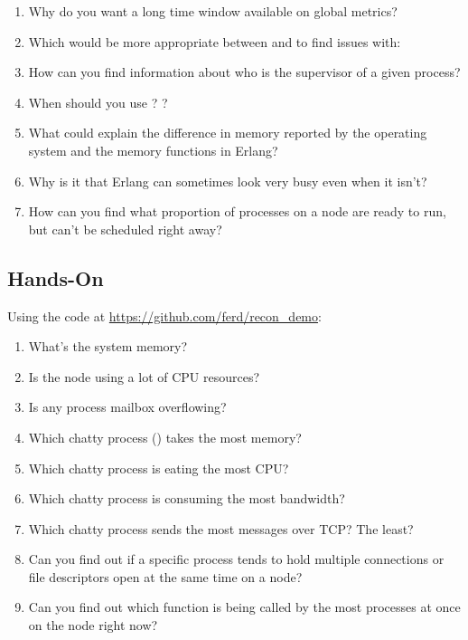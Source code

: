 \documentclass[11pt, oneside]{book}   	%
\begin{document}
\begin{enumerate}
	\item Why do you want a long time window available on global metrics?
	\item Which would be more appropriate between  and  to find issues with:
	\item How can you find information about who is the supervisor of a given process?
	\item When should you use ? ?
	\item What could explain the difference in memory reported by the operating system and the memory functions in Erlang?
	\item Why is it that Erlang can sometimes look very busy even when it isn't?
	\item How can you find what proportion of processes on a node are ready to run, but can't be scheduled right away?
\end{enumerate}

\subsection*{Hands-On}

Using the code at \href{https://github.com/ferd/recon\_demo}{https://github.com/ferd/recon\_demo}:

\begin{enumerate}
	\item What's the system memory?
	\item Is the node using a lot of CPU resources?
	\item Is any process mailbox overflowing?
	\item Which chatty process () takes the most memory?
	\item Which chatty process is eating the most CPU?
	\item Which chatty process is consuming the most bandwidth?
	\item Which chatty process sends the most messages over TCP? The least?
	\item Can you find out if a specific process tends to hold multiple connections or file descriptors open at the same time on a node?
	\item Can you find out which function is being called by the most processes at once on the node right now?
\end{enumerate}
\end{document}

